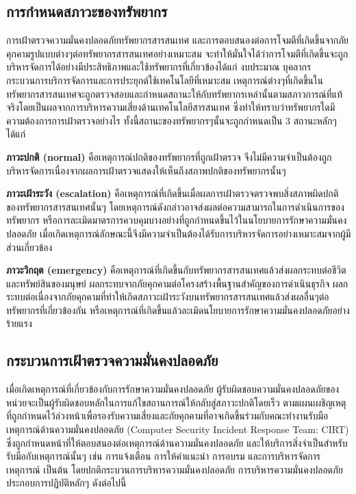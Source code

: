 \documentclass[../th_cyber_warfare_distilled.tex]{subfiles}
\begin{document}
\subsection{การกำหนดสภาวะของทรัพยากร}
การเฝ้าตรวจความมั่นคงปลอดภัยทรัพยากรสารสนเทศ และการตอบสนองต่อการโจมตีที่เกิดขึ้นจากภัยคุกคามรูปแบบต่างๆต่อทรัพยากรสารสนเทศอย่างเหมาะสม จะทำให้มั่นใจได้ว่าการโจมตีที่เกิดขึ้นจะถูกบริหารจัดการได้อย่างมีประสิทธิภาพและใช้ทรัพยากรที่เกี่ยวข้องได้แก่ งบประมาณ บุคลากร กระบวนการบริการจัดการและการประยุกต์ใช้เทคโนโลยีที่เหมาะสม เหตุการณ์ต่างๆที่เกิดขึ้นในทรัพยากรสารสนเทศจะถูกตรวจสอบและกำหนดสถานะให้กับทรัพยากรเหล่านั้นตามสภาวการณ์ที่แท้จริงโดยเป็นผลจากการบริหารความเสี่ยงด้านเทคโนโลยีสารสนเทศ ซึ่งทำให้ทราบว่าทรัพยากรใดมีความต้องการการเฝ้าตรวจอย่างไร ทั้งนี้สถานะของทรัพยากรๆนั้นจะถูกกำหนดเป็น 3 สถานะหลักๆได้แก่

\textbf{ภาวะปกติ (normal)} คือเหตุการณ์ปกติของทรัพยากรที่ถูกเฝ้าตรวจ จึงไม่มีความจำเป็นต้องถูกบริหารจัดการเนื่องจากผลการเฝ้าตรวจแสดงให้เห็นถึงสภาพปกติของทรัพยากรนั้นๆ

\textbf{ภาวะเฝ้าระวัง (escalation)} คือเหตุการณ์ที่เกิดขึ้นเมื่อผลการเฝ้าตรวจตรวจพบสิ่งสภาพผิดปกติของทรัพยากรสารสนเทศนั้นๆ โดยเหตุการณ์ดังกล่าวอาจส่งผลต่อความสามารถในการดำเนินการของทรัพยากร หรือการละเมิดมาตรการควบคุมบางอย่างที่ถูกกำหนดขึ้นไว้ในนโยบายการรักษาความมั่นคงปลอดภัย เมื่อเกิดเหตุการณ์ลักษณะนี้จึงมีความจำเป็นต้องได้รับการบริหารจัดการอย่างเหมาะสมจากผู้มีส่วนเกี่ยวข้อง

\textbf{ภาวะวิกฤต (emergency)} คือเหตุการณ์ที่เกิดขึ้นกับทรัพยากรสารสนเทศแล้วส่งผลกระทบต่อชีวิตและทรัพย์สินของมนุษย์ ผลกระทบจากภัยคุกคามต่อโครงสร้างพื้นฐานสำคัญของการดำเนินธุรกิจ ผลกระทบต่อเนื่องจากภัยคุกคามที่ทำให้เกิดสภาวะเฝ้าระวังบนทรัพยากรสารสนเทศแล้วส่งผลอื่นๆต่อทรัพยากรที่เกี่ยวข้องกัน หรือเหตุการณ์ที่เกิดขึ้นแล้วละเมิดนโยบายการรักษาความมั่นคงปลอดภัยอย่างร้ายแรง

\subsection{กระบวนการเฝ้าตรวจความมั่นคงปลอดภัย}
เมื่อเกิดเหตุการณ์ที่เกี่ยวข้องกับการรักษาความมั่นคงปลอดภัย ผู้รับผิดชอบความมั่นคงปลอดภัยของหน่วยจะเป็นผู้รับผิดชอบหลักในการแก้ไขสถานการณ์ให้กลับสู่สภาวะปกติโดยเร็ว ตามแผนเผชิญเหตุที่ถูกกำหนดไว้ล่วงหน้าเพื่อรองรับความเสี่ยงและภัยคุกคามที่อาจเกิดขึ้นร่วมกับคณะทำงานรับมือเหตุการณ์ด้านความมั่นคงปลอดภัย (Computer Security Incident Response Team: CIRT) ซึ่งถูกกำหนดหน้าที่ให้ตอบสนองต่อเหตุการณ์ด้านความมั่นคงปลอดภัย และให้บริการสิ่งจำเป็นสำหรับรับมือกับเหตุการณ์นั้นๆ เช่น การแจ้งเตือน การให้คำแนะนำ การอบรม และการบริหารจัดการเหตุการณ์ เป็นต้น โดยปกติกระบวนการบริหารความมั่นคงปลอดภัย
การบริหารความมั่นคงปลอดภัยประกอบการปฏิบัติหลักๆ ดังต่อไปนี้
\end{document}
